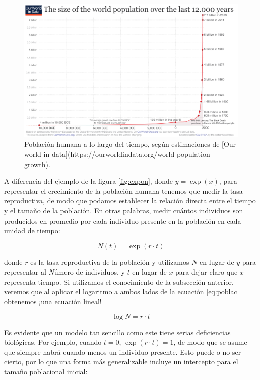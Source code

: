 \documentclass[
]{book}
\begin{document}
\begin{figure}

{\centering \includegraphics{Unidad-I/popn} 

}

\caption{Población humana a lo largo del tiempo, según estimaciones de [Our world in data](https://ourworldindata.org/world-population-growth).}\label{fig:popn-wd}
\end{figure}

A diferencia del ejemplo de la figura \ref{fig:expon}, donde \(y = \exp(x)\), para representar el crecimiento de la población humana tenemos que medir la tasa reproductiva, de modo que podamos establecer la relación directa entre el tiempo y el tamaño de la población. En otras palabras, medir cuántos individuos son producidos en promedio por cada individuo presente en la población en cada unidad de tiempo:

\begin{equation}
N(t) = \exp(r \cdot t) \label{eq:poblac}
\end{equation}

donde \(r\) es la tasa reproductiva de la población y utilizamos \(N\) en lugar de \(y\) para representar al \(N\)úmero de individuos, y \(t\) en lugar de \(x\) para dejar claro que \(x\) representa tiempo. Si utilizamos el conocimiento de la subsección anterior, veremos que al aplicar el logaritmo a ambos lados de la ecuación \eqref{eq:poblac} obtenemos ¡una ecuación lineal!

\begin{equation}
    \log N = r \cdot t
\end{equation}

Es evidente que un modelo tan sencillo como este tiene serias deficiencias biológicas. Por ejemplo, cuando \(t = 0\), \(\exp(r \cdot t) = 1\), de modo que se asume que siempre habrá cuando menos un individuo presente. Esto puede o no ser cierto, por lo que una forma más generalizable incluye un intercepto para el tamaño poblacional inicial:
\end{document}
